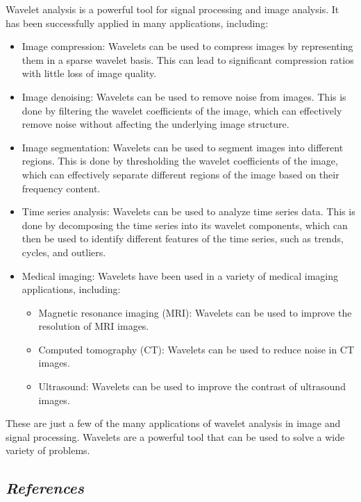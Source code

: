 \documentclass[12pt, a4paper]{article} %
\begin{document}
Wavelet analysis is a powerful tool for signal processing and image analysis. It has been successfully applied in many applications, including:

\begin{itemize}
    \item Image compression: Wavelets can be used to compress images by representing them in a sparse wavelet basis. This can lead to significant compression ratios with little loss of image quality.
    \item Image denoising: Wavelets can be used to remove noise from images. This is done by filtering the wavelet coefficients of the image, which can effectively remove noise without affecting the underlying image structure.
    \item Image segmentation: Wavelets can be used to segment images into different regions. This is done by thresholding the wavelet coefficients of the image, which can effectively separate different regions of the image based on their frequency content.
    \item Time series analysis: Wavelets can be used to analyze time series data. This is done by decomposing the time series into its wavelet components, which can then be used to identify different features of the time series, such as trends, cycles, and outliers.
    \item Medical imaging: Wavelets have been used in a variety of medical imaging applications, including:
    \begin{itemize}
        \item Magnetic resonance imaging (MRI): Wavelets can be used to improve the resolution of MRI images.
        \item Computed tomography (CT): Wavelets can be used to reduce noise in CT images.
        \item Ultrasound: Wavelets can be used to improve the contrast of ultrasound images.
    \end{itemize}
\end{itemize}

These are just a few of the many applications of wavelet analysis in image and signal processing. Wavelets are a powerful tool that can be used to solve a wide variety of problems.

\BgThispage
\subsection{\slshape References}
\end{document}
